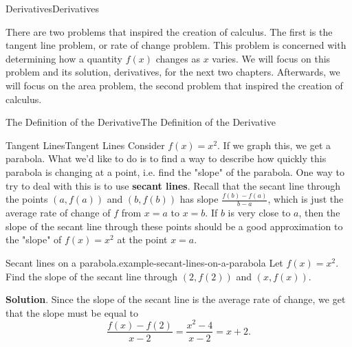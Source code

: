 \documentclass[10pt,]{book}
\newcommand{\terminology}[1]{\textbf{#1}}
\numberwithin{equation}{section}
\begin{document}
\begin{chapterptx}{Derivatives}{}{Derivatives}{}{}\label{derivatives}
\begin{introduction}{}%
\hypertarget{p-74}{}%
There are two problems that inspired the creation of calculus. The first is the tangent line problem, or rate of change problem. This problem is concerned with determining how a quantity \(f(x)\) changes as \(x\) varies. We will focus on this problem and its solution, derivatives, for the next two chapters. Afterwards, we will focus on the area problem, the second problem that inspired the creation of calculus.%
\end{introduction}%
%
%
\typeout{************************************************}
\typeout{************************************************}
%
\begin{sectionptx}{The Definition of the Derivative}{}{The Definition of the Derivative}{}{}\label{section-the-definition-of-the-derivative}
%
%
\typeout{************************************************}
\typeout{************************************************}
%
\begin{subsectionptx}{Tangent Lines}{}{Tangent Lines}{}{}\label{subsection-tangent-lines}
\hypertarget{p-75}{}%
Consider \(f(x) = x^{2}\). If we graph this, we get a parabola. What we'd like to do is to find a way to describe how quickly this parabola is changing at a point, i.e. find the "slope" of the parabola. One way to try to deal with this is to use \terminology{secant lines}. Recall that the secant line through the points \((a,f(a))\) and \((b,f(b))\) has slope \(\frac{f(b) - f(a)}{b-a}\), which is just the average rate of change of \(f\) from \(x=a\) to \(x=b\). If \(b\) is very close to \(a\), then the slope of the secant line through these points should be a good approximation to the "slope" of \(f(x) = x^{2}\) at the point \(x=a\).%
\begin{example}{Secant lines on a parabola.}{example-secant-lines-on-a-parabola}%
\hypertarget{p-76}{}%
Let \(f(x) = x^{2}\). Find the slope of the secant line through \((2,f(2))\) and \((x,f(x))\).%
\par\smallskip%
\noindent\textbf{Solution}.\hypertarget{solution-16}{}\quad%
\hypertarget{p-77}{}%
Since the slope of the secant line is the average rate of change, we get that the slope must be equal to%
\begin{equation*}
\frac{f(x) - f(2)}{x-2} = \frac{x^{2} - 4}{x-2} = x+2.
\end{equation*}

\end{example}
\end{subsectionptx}
\end{sectionptx}
\end{chapterptx}
\end{document}
